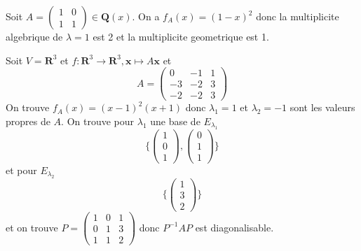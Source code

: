 \begin{example}
Soit $A=\begin{pmatrix} 1 & 0 \\ 1 & 1\end{pmatrix}\in \mathbf{Q}(x)$. On a $f_{A}(x)=(1-x)^{2}$ donc la multiplicite algebrique de $\lambda=1$ est 2 et la multiplicite geometrique est 1.  
\end{example}
\begin{example}
Soit $V=\mathbf{R}^{3}$ et $f:\mathbf{R}^{3}\to \mathbf{R}^{3},\boldsymbol{x}\mapsto A\boldsymbol{x}$ et 
$$
A=\begin{pmatrix}
0 & -1 & 1 \\
-3 & -2 & 3 \\
-2 & -2 & 3
\end{pmatrix}
$$
On trouve $f_{A}(x)=(x-1)^{2}(x+1)$ donc $\lambda_{1}=1$ et $\lambda_{2}=-1$ sont les valeurs propres de $A$. On trouve pour $\lambda_{1}$ une base de $E_{\lambda_{1}}$
$$
\{ \begin{pmatrix}
1 \\
0 \\
1
\end{pmatrix},\begin{pmatrix}0 \\
1 \\
1
\end{pmatrix} \}
$$
et pour $E_{\lambda_{2}}$
$$
\{ \begin{pmatrix}
1 \\
3 \\
2
\end{pmatrix} \}
$$
et on trouve $P=\begin{pmatrix}1 & 0  & 1 \\ 0 & 1 & 3 \\ 1 & 1 & 2\end{pmatrix}$ donc $P^{-1}AP$ est diagonalisable.
\end{example}

